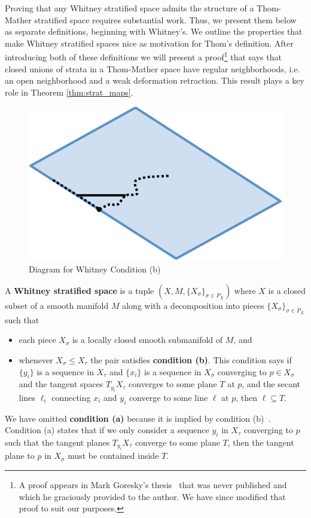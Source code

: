 Proving that any Whitney stratified space admits the structure of a Thom-Mather stratified space requires substantial work. Thus, we present them below as separate definitions, beginning with Whitney's. We outline the properties that make Whitney stratified spaces nice as motivation for Thom's definition. After introducing both of these definitions we will present a proof\footnote{A proof appears in Mark Goresky's thesis~\cite{goresky-thesis} that was never published and which he graciously provided to the author. We have since modified that proof to suit our purposes.} that says that closed unions of strata in a Thom-Mather space have regular neighborhoods, i.e. an open neighborhood and a weak deformation retraction. This result plays a key role in Theorem \ref{thm:strat_maps}.

\begin{figure}
	\centering
	\includegraphics[width=.6\textwidth]{whitney_b_bold.pdf}
	\caption{Diagram for Whitney Condition (b)}
	\label{fig:whitney_b}
\end{figure}

\begin{defn}
	A \textbf{Whitney stratified space} is a tuple $(X,M,\{X_{\sigma}\}_{\sigma\in P_X})$ where $X$ is a closed subset of a smooth manifold $M$ along with a decomposition into pieces $\{X_{\sigma}\}_{\sigma\in P_X}$ such that
	\begin{itemize}
		\item each piece $X_{\sigma}$ is a locally closed smooth submanifold of $M$, and
		\item whenever $X_{\sigma}\leq X_{\tau}$ the pair satisfies \textbf{condition (b)}. This condition says if $\{y_i\}$ is a sequence in $X_{\tau}$ and $\{x_i\}$ is a sequence in $X_{\sigma}$ converging to $p\in X_{\sigma}$ and the tangent spaces $T_{y_i}X_{\tau}$ converges to some plane $T$ at $p$, and the secant lines $\ell_i$ connecting $x_i$ and $y_i$ converge to some line $\ell$ at $p$, then $\ell\subseteq T$.
	\end{itemize}
\end{defn}
\begin{rmk}
	We have omitted \textbf{condition (a)} because it is implied by condition (b)~\cite[Prop. 2.4]{mather}. Condition (a) states that if we only consider a sequence $y_i$ in $X_{\tau}$ converging to $p$ such that the tangent planes $T_{y_i}X_{\tau}$ converge to some plane $T$, then the tangent plane to $p$ in $X_{\sigma}$ must be contained inside $T$.
\end{rmk}

